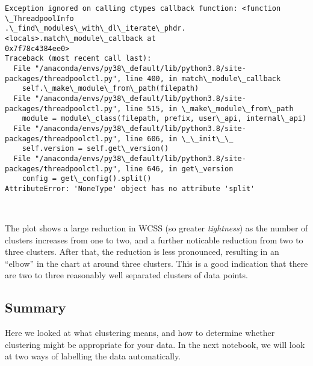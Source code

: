 \documentclass[11pt]{article}
\begin{document}
\begin{Verbatim}[commandchars=\\\{\}]
Exception ignored on calling ctypes callback function: <function \_ThreadpoolInfo
.\_find\_modules\_with\_dl\_iterate\_phdr.<locals>.match\_module\_callback at
0x7f78c4384ee0>
Traceback (most recent call last):
  File "/anaconda/envs/py38\_default/lib/python3.8/site-
packages/threadpoolctl.py", line 400, in match\_module\_callback
    self.\_make\_module\_from\_path(filepath)
  File "/anaconda/envs/py38\_default/lib/python3.8/site-
packages/threadpoolctl.py", line 515, in \_make\_module\_from\_path
    module = module\_class(filepath, prefix, user\_api, internal\_api)
  File "/anaconda/envs/py38\_default/lib/python3.8/site-
packages/threadpoolctl.py", line 606, in \_\_init\_\_
    self.version = self.get\_version()
  File "/anaconda/envs/py38\_default/lib/python3.8/site-
packages/threadpoolctl.py", line 646, in get\_version
    config = get\_config().split()
AttributeError: 'NoneType' object has no attribute 'split'
    \end{Verbatim}

    \begin{center}
    \end{center}
    { \hspace*{\fill} \\}
    
    The plot shows a large reduction in WCSS (so greater \emph{tightness})
as the number of clusters increases from one to two, and a further
noticable reduction from two to three clusters. After that, the
reduction is less pronounced, resulting in an ``elbow'' in the chart at
around three clusters. This is a good indication that there are two to
three reasonably well separated clusters of data points.

\hypertarget{summary}{%
\subsection{Summary}\label{summary}}

Here we looked at what clustering means, and how to determine whether
clustering might be appropriate for your data. In the next notebook, we
will look at two ways of labelling the data automatically.


    
    
    
\end{document}
